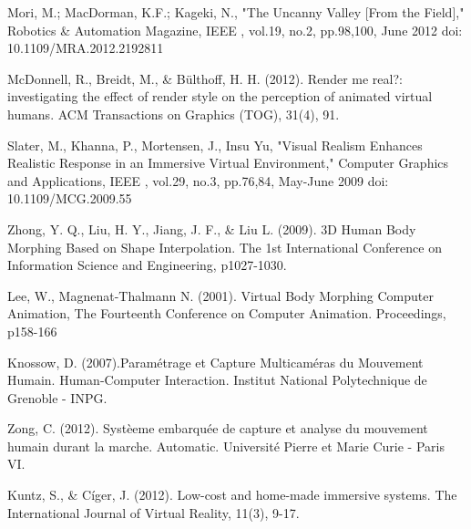 \begin{thebibliography}{10}
 	Mori, M.; MacDorman, K.F.; Kageki, N., "The Uncanny Valley [From the Field]," Robotics \& Automation Magazine, IEEE , vol.19, no.2, pp.98,100, June 2012 doi: 10.1109/MRA.2012.2192811
 	
 	McDonnell, R., Breidt, M., \& Bülthoff, H. H. (2012). Render me real?: investigating the effect of render style on the perception of animated virtual humans. ACM Transactions on Graphics (TOG), 31(4), 91.
 	
 	
 	
 	Slater, M., Khanna, P., Mortensen, J., Insu Yu, "Visual Realism Enhances Realistic Response in an Immersive Virtual Environment," Computer Graphics and Applications, IEEE , vol.29, no.3, pp.76,84, May-June 2009 doi: 10.1109/MCG.2009.55
 	
 	Zhong, Y. Q., Liu, H. Y., Jiang, J. F., \& Liu L. (2009). 3D Human Body Morphing Based on Shape Interpolation. The 1st International Conference on Information Science and Engineering, p1027-1030.
 	
	 Lee, W., Magnenat-Thalmann N. (2001). Virtual Body Morphing Computer Animation, The Fourteenth Conference on Computer Animation. Proceedings, p158-166
 	
 	Knossow, D. (2007).Paramétrage et Capture Multicaméras du Mouvement Humain. Human-Computer Interaction. Institut National Polytechnique de Grenoble - INPG.
 	
 	Zong, C. (2012). Systèeme embarquée de capture et analyse du mouvement humain durant la 	marche. Automatic. Université Pierre et Marie Curie - Paris VI.
  	
  	Kuntz, S., \& Cíger, J. (2012). Low-cost and home-made immersive systems. The International Journal of Virtual Reality, 11(3), 9-17.
  	

\end{thebibliography}
